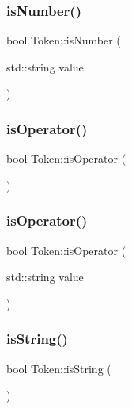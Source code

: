 \mbox{\label{classToken_a4d5ebcf88c3cbfb292fed830172b6e2e}} 
\subsubsection{\texorpdfstring{is\+Number()}{isNumber()}\hspace{0.1cm}{\footnotesize\ttfamily [2/2]}}
{\footnotesize\ttfamily bool Token\+::is\+Number (\begin{DoxyParamCaption}\item[{std\+::string}]{value }\end{DoxyParamCaption})}

\mbox{\label{classToken_a5392c44a7daf5fba6caa41ce12385a51}} 
\subsubsection{\texorpdfstring{is\+Operator()}{isOperator()}\hspace{0.1cm}{\footnotesize\ttfamily [1/2]}}
{\footnotesize\ttfamily bool Token\+::is\+Operator (\begin{DoxyParamCaption}{ }\end{DoxyParamCaption})}

\mbox{\label{classToken_ad7245e07c9d34fa9e9e5f497b221494f}} 
\subsubsection{\texorpdfstring{is\+Operator()}{isOperator()}\hspace{0.1cm}{\footnotesize\ttfamily [2/2]}}
{\footnotesize\ttfamily bool Token\+::is\+Operator (\begin{DoxyParamCaption}\item[{std\+::string}]{value }\end{DoxyParamCaption})}

\mbox{\label{classToken_aa0b7e4fc76b48f23b0b9cd5daf357f7b}} 
\subsubsection{\texorpdfstring{is\+String()}{isString()}\hspace{0.1cm}{\footnotesize\ttfamily [1/2]}}
{\footnotesize\ttfamily bool Token\+::is\+String (\begin{DoxyParamCaption}{ }\end{DoxyParamCaption})}

